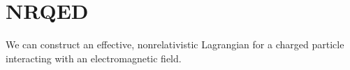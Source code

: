 \chapter{NRQED}




We can construct an effective, nonrelativistic Lagrangian for a charged particle interacting with an electromagnetic field.




